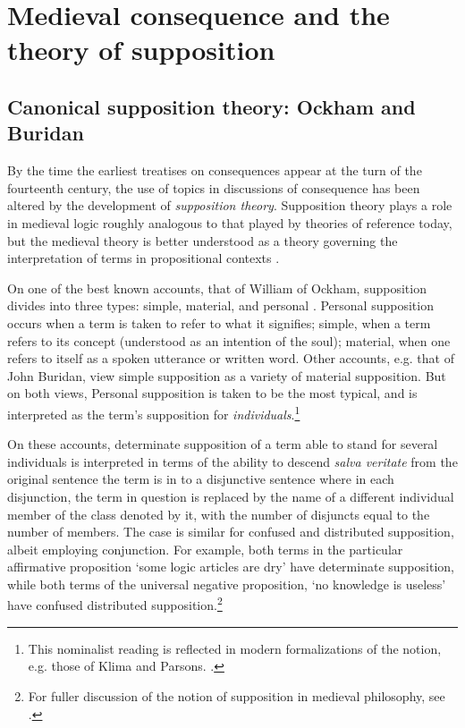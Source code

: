 \documentclass[a4paper, 11pt]{article}
\begin{document}
\section{Medieval consequence and the theory of supposition}
\subsection{Canonical supposition theory: Ockham and Buridan}
By the time the earliest treatises on consequences appear at the turn of the fourteenth century, the use of topics in discussions of consequence has been  altered by the development of \emph{supposition theory}. Supposition theory plays a role in medieval logic roughly analogous to that played by theories of reference today, but the medieval theory is better understood as a theory governing the interpretation of terms in propositional contexts \autocite{DutilhNovaes2007,DutilhNovaes2008b}. 

On one of the best known accounts, that of William of Ockham, supposition divides into three types: simple, material, and personal \autocite[193-197]{OckhamSL}. Personal supposition occurs when a term is taken to refer to what it signifies; simple,  when a term refers to its concept (understood as an intention of the soul); material, when one refers to itself as a spoken utterance or written word. Other accounts, e.g. that of John Buridan, view simple supposition as a variety of material supposition. But on both views, Personal supposition is taken to be the most typical, and is interpreted as the term's supposition for \emph{individuals}.\footnote{This nominalist reading is reflected in modern formalizations of the notion, e.g. those of Klima and Parsons. \autocite{Klima1988,Parsons2014}.} 

On these accounts, determinate supposition of a term able to stand for several individuals is interpreted in terms of the ability to descend \emph{salva veritate} from the original sentence the term is in to a disjunctive sentence where in each disjunction, the term in question is replaced by the name of a different individual member of the class denoted by it, with the number of disjuncts equal to the number of members. The case is similar for confused and distributed supposition, albeit employing conjunction. For example, both terms in the particular affirmative proposition `some logic articles are dry' have determinate supposition, while both terms of the universal negative proposition, `no knowledge is useless' have confused distributed supposition.\footnote{For fuller discussion of the notion of supposition in medieval philosophy, see \autocite{Klima1988,PriestRead1977,HodgesBurley,Parsons2014}.}
\end{document}
